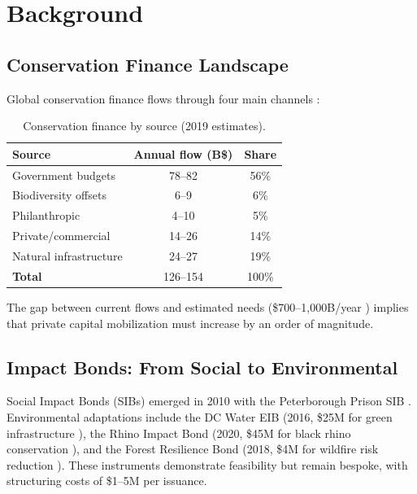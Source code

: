 \section{Background}

\label{sec:background}

\subsection{Conservation Finance Landscape}

Global conservation finance flows through four main channels
\citep{deutz2020financing}:

\begin{table}[H]
\centering
\caption{Conservation finance by source (2019 estimates).}
\label{tab:finance}
\begin{tabular}{lcc}
\toprule
\textbf{Source} & \textbf{Annual flow (B\$)} & \textbf{Share} \\
\midrule
Government budgets     & 78--82  & 56\% \\
Biodiversity offsets   & 6--9    & 6\% \\
Philanthropic          & 4--10   & 5\% \\
Private/commercial     & 14--26  & 14\% \\
Natural infrastructure & 24--27  & 19\% \\
\midrule
\textbf{Total}         & 126--154 & 100\% \\
\bottomrule
\end{tabular}
\end{table}

The gap between current flows and estimated needs (\$700--1{,}000B/year
\citep{paulson2020financing}) implies that private capital mobilization
must increase by an order of magnitude.

\subsection{Impact Bonds: From Social to Environmental}

Social Impact Bonds (SIBs) emerged in 2010 with the Peterborough Prison
SIB \citep{liebman2011social}. Environmental adaptations include the DC
Water EIB (2016, \$25M for green infrastructure
\citep{nicola2013quantifying}), the Rhino Impact Bond (2020, \$45M for
black rhino conservation \citep{uct2020rhino}), and the Forest
Resilience Bond (2018, \$4M for wildfire risk reduction
\citep{blue2019forest}). These instruments demonstrate feasibility but
remain bespoke, with structuring costs of \$1--5M per issuance.

